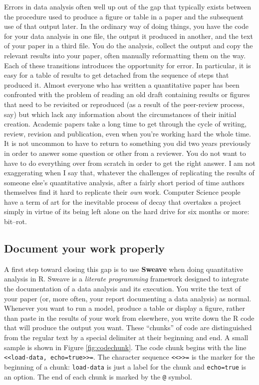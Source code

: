 \documentclass[11pt,article,oneside]{memoir}
\begin{document}
Errors in data analysis often well up out of the gap that typically exists between the procedure used to produce a figure or table in a paper and the subsequent use of that output later. In the ordinary way of doing things, you have the code for your data analysis in one file, the output it produced in another, and the text of your paper in a third file. You do the analysis, collect the output and copy the relevant results into your paper, often manually reformatting them on the way. Each of these transitions introduces the opportunity for error. In particular, it is easy for a table of results to get detached from the sequence of steps that produced it. Almost everyone who has written a quantitative paper has been confronted with the problem of reading an old draft containing results or figures that need to be revisited or reproduced (as a result of the peer-review process, say) but which lack any information about the circumstances of their initial creation. Academic papers take a long time to get through the cycle of writing, review, revision and publication, even when you're working hard the whole time. It is not uncommon to have to return to something you did two years previously in order to answer some question or other from a reviewer. You do not want to have to do everything over from scratch in order to get the right answer. I am not exaggerating when I say that, whatever the challenges of replicating the results of someone else's quantitative analysis, after a fairly short period of time authors themselves find it hard to replicate their \emph{own} work. Computer Science people have a term of art for the inevitable process of decay that overtakes a project simply in virtue of its being left alone on the hard drive for six months or more: bit--rot.

\subsection{Document your work properly} %
\label{sub:document_your_work}
A first step toward closing this gap is to use \textbf{Sweave} when doing quantitative analysis in R. Sweave is a \emph{literate programming} framework designed to integrate the documentation of a data analysis and its execution. You write the text of your paper (or, more often, your report documenting a data analysis) as normal. Whenever you want to run a model, produce a table or display a figure, rather than paste in the results of your work from elsewhere, you write down the R code that will produce the output you want. These ``chunks'' of code are distinguished from the regular text by a special delimiter at their beginning and end. A small sample is shown in Figure \ref{fig:codechunk}. The code chunk begins with the line \lstinline!<<load-data, echo=true>>=!. The character sequence \lstinline!<<>>=! is the marker for the beginning of a chunk: \lstinline!load-data! is just a label for the chunk and \lstinline!echo=true! is an option. The end of each chunk is marked by the \lstinline!@! symbol.
\end{document}
